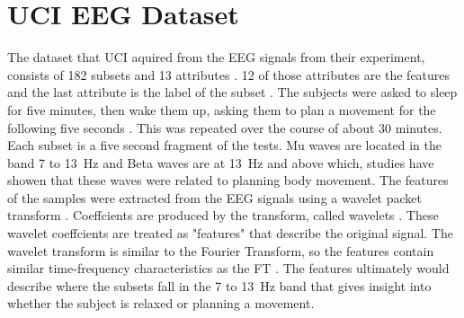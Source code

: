 \documentclass{report}
\begin{document}
\section{UCI EEG Dataset}
The dataset that UCI aquired from the EEG signals from their experiment, consists of 182 subsets and 13 
attributes \cite{classsvm}. 12 of those attributes are the features and the last attribute is the label of the subset \cite{online}. 
The subjects were asked to sleep for five minutes, then 
wake them up, asking them to plan a movement for the following five seconds \cite{classsvm}. This 
was repeated over the course of about 30 minutes. Each subset is a five second fragment of the tests. 
Mu waves are located in the band 7 to \SI{13}{\hertz} and Beta waves are at \SI{13}{\hertz} and above \cite{classsvm} which, studies have showen that these waves were 
related to planning body movement. The features of the samples were extracted from the EEG signals using a wavelet packet transform \cite{online}. 
Coeffcients are produced by the transform, called wavelets \cite{wavelet}. These wavelet coeffcients are treated as "features" that describe the original signal.
The wavelet transform is similar to the Fourier Transform, so the features contain similar time-frequency characteristics as the FT \cite{packet}. 
The features ultimately would describe where the subsets fall in the 7 to \SI{13}{\hertz} band that gives insight into whether the subject is relaxed or planning a movement.
\end{document}
